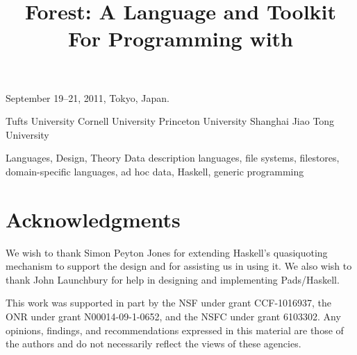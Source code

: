 \documentclass[natbib]{sigplanconf}
\newif\iftr\trfalse              %
\newif\ifappendix\appendixfalse   %
\begin{document}


 {September 19--21, 2011, Tokyo, Japan.}

\title{Forest\iftr{} 1.0\fi: A Language and Toolkit For Programming with \Filestores{}}

	   {Tufts University}{}
           {Cornell University}{}
           {Princeton University}{}
           {Shanghai Jiao Tong University}{}

\maketitle{}

\begin{abstract}  

\end{abstract}

\terms
Languages, Design, Theory
\keywords
Data description languages, file systems, filestores,
domain-specific languages, ad hoc data, Haskell,
generic programming











\section*{Acknowledgments}

We wish to thank Simon Peyton Jones for extending Haskell's
quasiquoting mechanism to support the \forest{} design and for
assisting us in using it.  We also wish to thank John Launchbury for
help in designing and implementing Pads/Haskell.

This work was supported in part by the NSF under grant CCF-1016937,
the ONR under grant N00014-09-1-0652, and the NSFC under grant
6103302. Any opinions, findings, and recommendations expressed in this
material are those of the authors and do not necessarily reflect the
views of these agencies.


\balance


\ifappendix
\onecolumn
\newpage
\appendix

\closeproofchan
\section{Proofs}

\noindent This appendix contains the proofs of the theorems stated in
Section~\ref{sec:theory}.

\label{sec:proof-appendix}

\newpage

\fi
\end{document}
